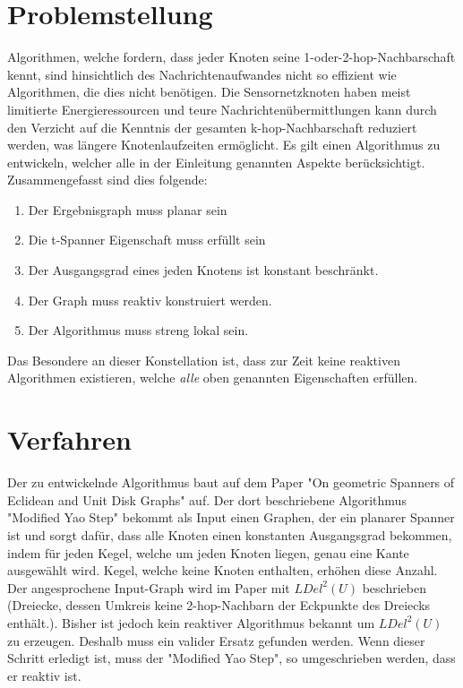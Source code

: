 \documentclass[a4paper,DIV10,10pt,headsepline,smallheadings]{scrreprt}
\begin{document}
\section{Problemstellung}
Algorithmen, welche fordern, dass jeder Knoten seine 1-oder-2-hop-Nachbarschaft kennt, sind hinsichtlich des Nachrichtenaufwandes nicht so effizient wie Algorithmen, die dies nicht benötigen.
Die Sensornetzknoten haben meist limitierte Energieressourcen und teure Nachrichtenübermittlungen kann durch den Verzicht auf die Kenntnis der gesamten k-hop-Nachbarschaft reduziert werden, was längere Knotenlaufzeiten ermöglicht.
Es gilt einen Algorithmus zu entwickeln, welcher alle in der Einleitung genannten Aspekte berücksichtigt.
Zusammengefasst sind dies folgende:
\begin{enumerate}
\item Der Ergebnisgraph muss planar sein
\item Die t-Spanner Eigenschaft muss erfüllt sein
\item Der Ausgangsgrad eines jeden Knotens ist konstant beschränkt.
\item Der Graph muss reaktiv konstruiert werden.
\item Der Algorithmus muss streng lokal sein.
\end{enumerate}
Das Besondere an dieser Konstellation ist, dass zur Zeit keine reaktiven Algorithmen existieren, welche \emph{alle} oben genannten Eigenschaften erfüllen.

\section{Verfahren}
Der zu entwickelnde Algorithmus baut auf dem Paper "On geometric Spanners of Eclidean and Unit Disk Graphs" auf.
Der dort beschriebene Algorithmus "Modified Yao Step" bekommt als Input einen Graphen, der ein planarer Spanner ist und sorgt dafür, dass alle Knoten einen konstanten Ausgangsgrad bekommen, indem für jeden Kegel, welche um jeden Knoten liegen, genau eine Kante ausgewählt wird.
Kegel, welche keine Knoten enthalten, erhöhen diese Anzahl.
Der angesprochene Input-Graph wird im Paper mit $LDel^2(U) $ beschrieben (Dreiecke, dessen Umkreis keine 2-hop-Nachbarn der Eckpunkte des Dreiecks enthält.).
Bisher ist jedoch kein reaktiver Algorithmus bekannt um $LDel^2(U) $ zu erzeugen.
Deshalb muss ein valider Ersatz gefunden werden.
Wenn dieser Schritt erledigt ist, muss der "Modified Yao Step", so umgeschrieben werden, dass er reaktiv ist.
\end{document}

